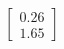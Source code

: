 \documentclass[preview]{standalone}
\begin{document}
\begin{align*}
\begin{bmatrix} 0.26 \\ 1.65 \end{bmatrix}
\end{align*}
\end{document}
